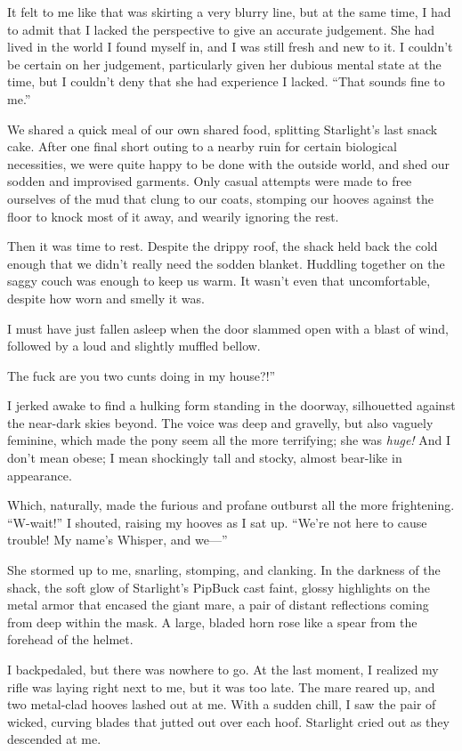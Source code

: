 It felt to me like that was skirting a very blurry line, but at the same time, I had to admit that I lacked the perspective to give an accurate judgement. She had lived in the world I found myself in, and I was still fresh and new to it. I couldn’t be certain on her judgement, particularly given her dubious mental state at the time, but I couldn’t deny that she had experience I lacked. “That sounds fine to me.”

We shared a quick meal of our own shared food, splitting Starlight’s last snack cake. After one final short outing to a nearby ruin for certain biological necessities, we were quite happy to be done with the outside world, and shed our sodden and improvised garments. Only casual attempts were made to free ourselves of the mud that clung to our coats, stomping our hooves against the floor to knock most of it away, and wearily ignoring the rest.

Then it was time to rest. Despite the drippy roof, the shack held back the cold enough that we didn’t really need the sodden blanket. Huddling together on the saggy couch was enough to keep us warm. It wasn’t even that uncomfortable, despite how worn and smelly it was.

I must have just fallen asleep when the door slammed open with a blast of wind, followed by a loud and slightly muffled bellow.

\leavevmode{}The fuck are you two cunts doing in my house?!”

I jerked awake to find a hulking form standing in the doorway, silhouetted against the near-dark skies beyond. The voice was deep and gravelly, but also vaguely feminine, which made the pony seem all the more terrifying; she was \textit{huge!} And I don’t mean obese; I mean shockingly tall and stocky, almost bear-like in appearance.

Which, naturally, made the furious and profane outburst all the more frightening. “W-wait!” I shouted, raising my hooves as I sat up. “We’re not here to cause trouble! My name’s Whisper, and we—”

She stormed up to me, snarling, stomping, and clanking. In the darkness of the shack, the soft glow of Starlight’s PipBuck cast faint, glossy highlights on the metal armor that encased the giant mare, a pair of distant reflections coming from deep within the mask. A large, bladed horn rose like a spear from the forehead of the helmet.

I backpedaled, but there was nowhere to go. At the last moment, I realized my rifle was laying right next to me, but it was too late. The mare reared up, and two metal-clad hooves lashed out at me. With a sudden chill, I saw the pair of wicked, curving blades that jutted out over each hoof. Starlight cried out as they descended at me.

